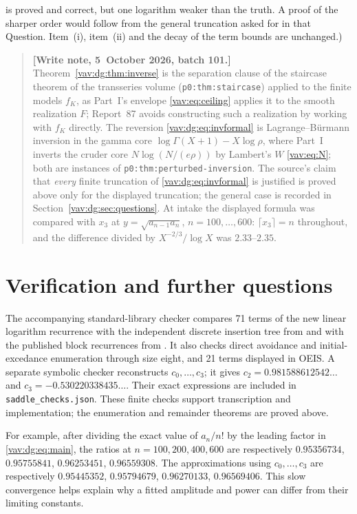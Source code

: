 \documentclass[11pt]{article}
\theoremstyle{remark}\newtheorem{remark}[theorem]{Remark}
\newenvironment{writenoteb}{\begin{quote}\small\raggedright\textbf{[Write note, 5~October 2026, batch 101.]}\ }{\end{quote}}
\begin{document}
is proved and correct, but one logarithm weaker than the truth. A proof of
the sharper order would follow from the general truncation asked for in
that Question. Item~(i), item~(ii) and the decay of the term bounds are
unchanged.)
\begin{writenoteb}
Theorem~\ref{vav:dg:thm:inverse} is the separation clause of the staircase
theorem of the transseries volume (\texttt{p0:thm:staircase}) applied to
the finite models $f_K$, as Part~I's envelope \eqref{vav:eq:ceiling} applies
it to the smooth realization $F$; Report~87 avoids constructing such a
realization by working with $f_K$ directly. The reversion
\eqref{vav:dg:eq:invformal} is Lagrange--B\"urmann inversion in the
gamma core $\log\Gamma(X+1)-X\log\rho$, where Part~I inverts the cruder
core $N\log(N/(e\rho))$ by Lambert's $W$ \eqref{vav:eq:N}; both are instances
of \texttt{p0:thm:perturbed-inversion}. The source's claim that
\emph{every} finite truncation of \eqref{vav:dg:eq:invformal} is justified
is proved above only for the displayed truncation; the general case is
recorded in Section~\ref{vav:dg:sec:questions}. At intake the displayed
formula was compared with $x_3$ at $y=\sqrt{a_{n-1}a_n}$,
$n=100,\ldots,600$: $\lceil x_3\rceil=n$ throughout, and the difference
divided by $X^{-2/3}/\log X$ was $2.33$--$2.35$.
\end{writenoteb}

\section{Verification and further questions}\label{vav:dg:sec:checks}
The accompanying standard-library checker compares 71 terms of the new
linear logarithm recurrence with the independent discrete insertion tree
from \cite{bck} and with the published block recurrences from
\cite{elizalde}. It also checks direct avoidance and initial-excedance
enumeration through size eight, and 21 terms displayed in OEIS.
A separate symbolic checker reconstructs $c_0,\ldots,c_3$; it gives
$c_2=0.981588612542\ldots$ and $c_3=-0.530220338435\ldots$.
Their exact expressions are included in \texttt{saddle\_checks.json}.
These finite checks support transcription and implementation; the
enumeration and remainder theorems are proved above.

For example, after dividing the exact value of $a_n/n!$ by the leading
factor in \eqref{vav:dg:eq:main}, the ratios at $n=100,200,400,600$ are respectively
$0.95356734$, $0.95755841$, $0.96253451$, $0.96559308$.
The approximations using $c_0,\ldots,c_3$ are respectively
$0.95445352$, $0.95794679$, $0.96270133$, $0.96569406$.
This slow convergence helps explain why a fitted amplitude and power
can differ from their limiting constants.
\end{document}
